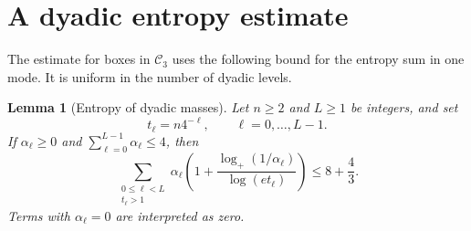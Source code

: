 \documentclass[10pt,a4paper]{amsart}
\numberwithin{equation}{section}
\newtheorem{lemma}[theorem]{Lemma}
\begin{document}
\appendix
\section{A dyadic entropy estimate}\label{app:dyadic}

The estimate for boxes in $\mathcal C_3$ uses the following bound
for the entropy sum in one mode. It is uniform in the number of
dyadic levels.

\begin{lemma}[Entropy of dyadic masses]\label{lem:mass}
Let $n\ge2$ and $L\ge1$ be integers, and set
\[
 t_\ell=n4^{-\ell},\qquad \ell=0,\ldots,L-1.
\]
If $\alpha_\ell\ge0$ and $\sum_{\ell=0}^{L-1}\alpha_\ell\le4$, then
\begin{equation}\label{eq:mass-entropy}
 \sum_{\substack{0\le\ell<L\\t_\ell>1}}\alpha_\ell
 \left(1+\frac{\log_+(1/\alpha_\ell)}{\log(et_\ell)}\right)
 \le 8+\frac43.
\end{equation}
Terms with $\alpha_\ell=0$ are interpreted as zero.
\end{lemma}
\end{document}
